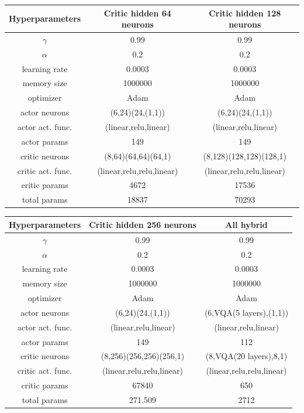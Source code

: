 \newline
\vspace{0.5 cm}
\newline
\begin{tabular}{|c|c|c|}
	\hline
	Hyperparameters & Critic hidden 64 neurons & Critic hidden 128 neurons \\
	\hline
	$\gamma$ & 0.99 & 0.99  \\
	\hline
	$\alpha$ & 0.2 & 0.2  \\
	\hline
	learning rate & 0.0003 & 0.0003  \\
	\hline
	memory size & 1000000 & 1000000   \\
	\hline
	optimizer & Adam & Adam  \\
	\hline
	actor neurons & (6,24)(24,(1,1)) & (6,24)(24,(1,1))  \\
	\hline
	actor act. func. & (linear,relu,linear) & (linear,relu,linear) \\
	\hline
	actor params & 149 & 149 \\
	\hline
	critic neurons & (8,64)(64,64)(64,1) & (8,128)(128,128)(128,1)  \\
	\hline
	critic act. func. & (linear,relu,relu,linear) & (linear,relu,relu,linear) \\
	\hline
	critic params & 4672 & 17536 \\
	\hline
	total params & 18837 & 70293 \\
	\hline
\end{tabular}
\newline
\vspace{0.5 cm}
\newline
\begin{tabular}{|c|c|c|}
	\hline
	Hyperparameters & Critic hidden 256 neurons & All hybrid \\
	\hline
	$\gamma$ & 0.99 & 0.99  \\
	\hline
	$\alpha$ & 0.2 & 0.2  \\
	\hline
	learning rate & 0.0003 & 0.0003  \\
	\hline
	memory size & 1000000 & 1000000   \\
	\hline
	optimizer & Adam & Adam  \\
	\hline
	actor neurons & (6,24)(24,(1,1)) & (6,VQA(5 layers),(1,1))  \\
	\hline
	actor act. func. & (linear,relu,linear) & (linear,relu,linear) \\
	\hline
	actor params & 149 & 112 \\
	\hline
	critic neurons & (8,256)(256,256)(256,1) & (8,VQA(20 layers),8,1)  \\
	\hline
	critic act. func. & (linear,relu,relu,linear) & (linear,relu,relu,linear) \\
	\hline
	critic params & 67840 & 650 \\
	\hline
	total params & 271.509 & 2712 \\
	\hline
\end{tabular}
